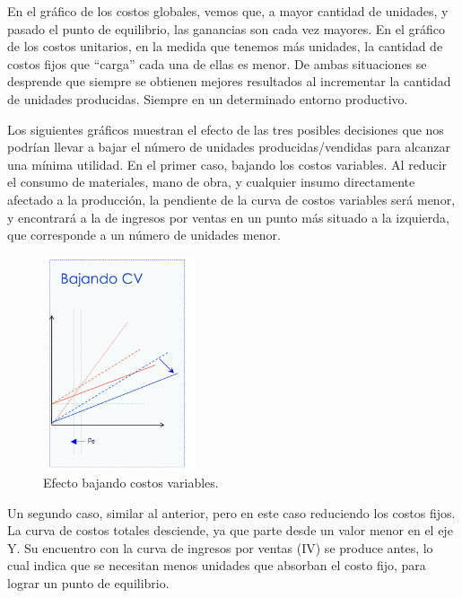 \documentclass[titlepage,a4paper]{article}
\begin{document}
En el gráfico de los costos globales, vemos que, a mayor cantidad de unidades, y pasado el punto de 
equilibrio, las ganancias son cada vez mayores. En el gráfico de los costos unitarios, en la medida que 
tenemos más unidades, la cantidad de costos fijos que “carga” cada una de ellas es menor. De ambas 
situaciones se desprende que siempre se obtienen mejores resultados al incrementar la cantidad de 
unidades producidas. Siempre en un determinado entorno productivo. 

Los siguientes gráficos muestran el efecto de las tres posibles decisiones que nos podrían llevar a 
bajar el número de unidades producidas/vendidas para alcanzar una mínima utilidad. En el primer caso, 
bajando los costos variables. Al reducir el consumo de materiales, mano de obra, y cualquier insumo 
directamente afectado a la producción, la pendiente de la curva de costos variables será menor, y 
encontrará a la de ingresos por ventas en un punto más situado a la izquierda, que corresponde a un 
número de unidades menor.

\begin{figure}[!htb]
    \centering
    \includegraphics[width=0.4\textwidth]{imagenes/KnoppelBajarVariable.PNG}
    \caption{Efecto bajando costos variables.}
\end{figure}

Un segundo caso, similar al anterior, pero en este caso 
reduciendo los costos fijos. La curva de costos totales 
desciende, ya que parte desde un valor menor en el eje Y. Su 
encuentro con la curva de ingresos por ventas (IV) se 
produce antes, lo cual indica que se necesitan menos 
unidades que absorban el costo fijo, para lograr un punto de 
equilibrio.
\end{document}
